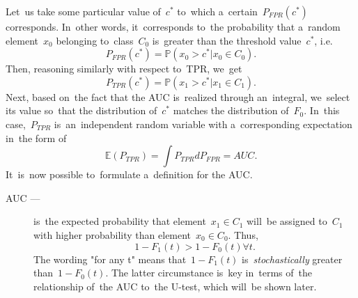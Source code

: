 \documentclass[]{scrreprt}
\begin{document}
Let~us take some particular value of~$c^{*}$ to~which a~certain~$P_{FPR}(c^{*})$ corresponds. In~other words, it~corresponds to~the probability that a~random element~$x_{0}$ belonging to~class~$C_{0}$ is~greater than the threshold value~$c^{*}$, i.e.
\begin{equation}\label{eq:AUC-computation-3}
P_{FPR}(c^{*}) = \mathbb{P}(x_{0}>c^{*}|x_{0} \in C_{0}).
\end{equation}
Then, reasoning similarly with respect to~TPR, we~get
\begin{equation}\label{eq:AUC-computation-4}
P_{TPR}(c^{*}) = \mathbb{P}(x_{1}>c^{*}|x_{1} \in C_{1}).
\end{equation}
Next, based on~the fact that the AUC is~realized through an~integral, we~select its value so~that the distribution of~$c^{*}$ matches the distribution of~$F_{0}$. In~this case,~$P_{TPR}$ is~an~independent random variable with a~corresponding expectation in~the form of
\begin{equation}\label{eq:AUC-computation-integral}
\mathbb{E}(P_{TPR}) = \int P_{TPR} d P_{FPR} = AUC.
\end{equation}
It~is~now possible to~formulate a~definition for the AUC.
\begin{description}
	\item[AUC ---] is~the expected probability that element~$x_{1} \in C_{1}$ will~be assigned to~$C_{1}$ with higher probability than element~$x_{0} \in C_{0}$. Thus,
	\begin{equation}\label{eq:AUC-definition}
	1-F_{1}(t)>1-F_{0}(t) \forall t.
	\end{equation}
	The wording "for any t" means that~$1-F_{1}(t)$ is~\emph{stochastically} greater than~$1-F_{0}(t)$. The latter circumstance is~key in~terms of~the relationship of~the AUC to~the U-test, which will~be shown later.
\end{description}
%
\subsection{}\label{U-test&AUC-relation}
%

\nocite{Essential-Statistical-Inference}
\nocite{AUC-optimization}
\nocite{Mann-Whitney-1947}
\nocite{Optimizing-classifier-performance}
\nocite{ROC-R-1}
\nocite{ROC-AUC-1}
\nocite{ROC-AUC-meets-U-R-1}

\printbibliography
\end{document}
